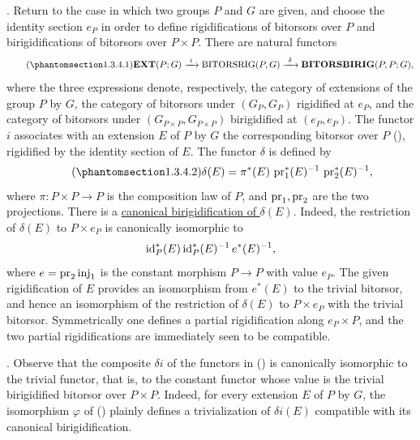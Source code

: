 
. Return to the case in which two groups $P$ and $G$ are given,
and choose the identity section $e_P$ in order to define
rigidifications of bitorsors over $P$ and birigidifications of bitorsors
over $P\times P$. There are natural functors
\begin{equation}\tag{\SGARefTarget{sga7.sga7i.evii.n1-3-4-1}{1.3.4.1}}
 \mathbf{EXT}(P;G)\xrightarrow{\ i\ }
 \mathrm{BITORSRIG}(P,G)\xrightarrow{\ \delta\ }
 \mathbf{BITORSBIRIG}(P,P;G),
\end{equation}
where the three expressions denote, respectively, the category of
extensions of the group $P$ by $G$, the category of bitorsors under
$(G_P,G_P)$ rigidified at $e_P$, and the category of bitorsors under
$(G_{P\times P},G_{P\times P})$ birigidified at $(e_P,e_P)$. The functor
$i$ associates with an extension $E$ of $P$ by $G$ the corresponding
bitorsor over $P$ (), rigidified by the identity section of $E$.
The functor $\delta$ is defined by
\begin{equation}\tag{\SGARefTarget{sga7.sga7i.evii.n1-3-4-2}{1.3.4.2}}
 \delta(E)=\pi^*(E)\,\pr_1^*(E)^{-1}\,\pr_2^*(E)^{-1},
\end{equation}
where $\pi:P\times P\longrightarrow P$ is the composition law of $P$,
and $\operatorname{pr}_1,\operatorname{pr}_2$ are the two projections. There is a
\underline{canonical birigidification of $\delta(E)$}. Indeed, the
restriction of $\delta(E)$ to $P\times e_P$ is canonically isomorphic
to
\[
 \mathrm{id}_P^*(E)\,\mathrm{id}_P^*(E)^{-1}\,e^*(E)^{-1},
\]
where $e=\operatorname{pr}_2\operatorname{inj}_1$ is the constant morphism
$P\longrightarrow P$ with value $e_P$. The given rigidification of $E$
provides an isomorphism from $e^*(E)$ to the trivial bitorsor, and hence
an isomorphism of the restriction of $\delta(E)$ to $P\times e_P$ with
the trivial bitorsor. Symmetrically one defines a partial
rigidification along $e_P\times P$, and the two partial
rigidifications are immediately seen to be compatible.


. Observe that the composite $\delta i$ of the functors in
() is canonically isomorphic to the trivial functor, that is, to
the constant functor whose value is the trivial birigidified bitorsor
over $P\times P$. Indeed, for every extension $E$ of $P$ by $G$, the
isomorphism $\varphi$ of () plainly defines a trivialization of
$\delta i(E)$ compatible with its canonical birigidification.

